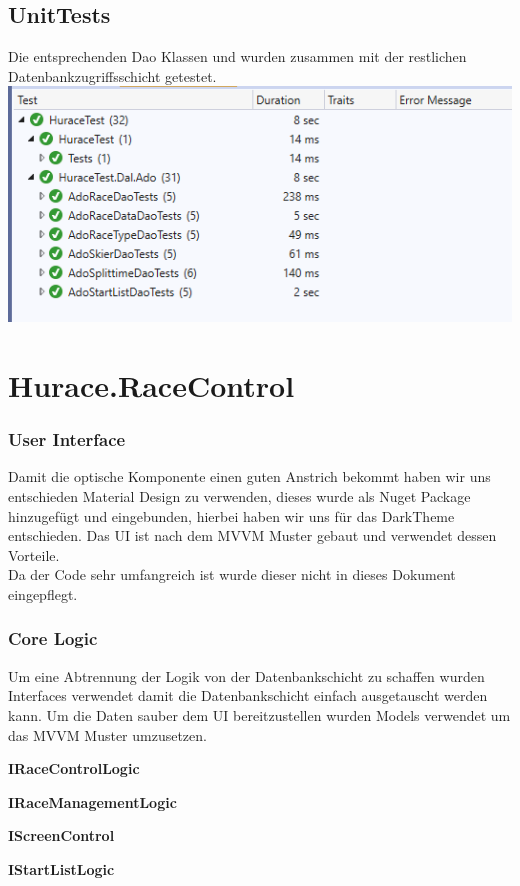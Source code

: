 \documentclass[a4paper, 12pt]{article}
\begin{document}
	\subsection{UnitTests}
	Die entsprechenden Dao Klassen und wurden zusammen mit der restlichen Datenbankzugriffsschicht getestet. 
	\newline
	\newline
	\includegraphics[width=.7\textwidth]{img/UnitTests.png}
	
	\section{Hurace.RaceControl}
	\subsubsection{User Interface}
	
	Damit die optische Komponente einen guten Anstrich bekommt haben wir uns entschieden Material Design zu verwenden, dieses wurde als Nuget Package hinzugefügt und eingebunden, hierbei haben wir uns für das DarkTheme entschieden. Das UI ist nach dem MVVM Muster gebaut und verwendet dessen Vorteile.\\
	Da der Code sehr umfangreich ist wurde dieser nicht in dieses Dokument eingepflegt.
	
	\newpage
	\subsubsection{Core Logic}
	Um eine Abtrennung der Logik von der Datenbankschicht zu schaffen wurden Interfaces verwendet damit die Datenbankschicht einfach ausgetauscht werden kann. Um die Daten sauber dem UI bereitzustellen wurden Models verwendet um das MVVM Muster umzusetzen.
	\newline
	
	\textbf{IRaceControlLogic}
	
	\textbf{IRaceManagementLogic}
	
	\textbf{IScreenControl}
	
	\textbf{IStartListLogic}
	
	
\end{document}
